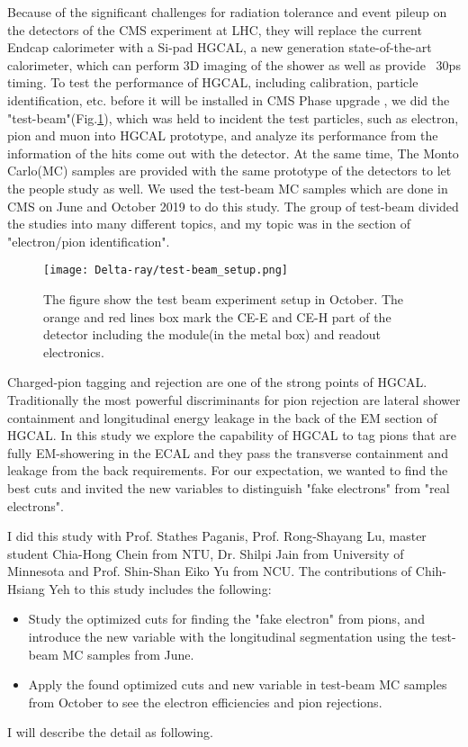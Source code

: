 \documentclass[12pt,twoside,a4paper,an,final]{cms-tdr}
\begin{document}
Because of the significant challenges for radiation tolerance and event pileup on the detectors of the CMS experiment at LHC, they will replace the current Endcap calorimeter with a Si-pad HGCAL, a new generation state-of-the-art calorimeter, which can perform 3D imaging of the shower as well as provide ~30ps timing. To test the performance of HGCAL, including calibration, particle identification, etc. before it will be installed in CMS Phase  upgrade , we did the "test-beam"(Fig.\ref{test_beam_setup_1}), which was held to incident the test particles, such as electron, pion and muon into HGCAL prototype, and analyze its performance from the information of the hits come out with the detector. At the same time,  The Monto Carlo(MC) samples are provided with the same prototype of the detectors to let the people study as well.  We used the test-beam MC samples which are done in CMS on June and October 2019 to do this study. The group of test-beam divided the studies into many different topics, and my topic was in the section of "electron/pion identification".
\begin{figure}[!htb]
\centering 
     \texttt{[image: Delta-ray/test-beam\_setup.png]}
\caption{The figure show the test beam experiment setup in October. The orange and red lines box mark the CE-E and CE-H part of the detector including the module(in the metal box) and readout electronics.}
\label{test_beam_setup_1}
\end{figure}

Charged-pion tagging and rejection are one of the strong points of HGCAL. Traditionally the most powerful discriminants for pion rejection are lateral shower containment and longitudinal energy leakage in the back of the EM section of HGCAL. In this study we explore the capability of HGCAL to tag pions that are fully EM-showering in the ECAL and they pass the transverse containment and leakage from the back requirements. For our expectation, we wanted to find the best cuts and invited the new variables to distinguish "fake electrons" from "real electrons".

I did this study with Prof. Stathes Paganis, Prof. Rong-Shayang Lu, master student Chia-Hong Chein from NTU, Dr. Shilpi Jain from University of Minnesota and Prof. Shin-Shan Eiko Yu from NCU.  The contributions of Chih-Hsiang Yeh to this study includes the following:
\begin{itemize}
\item Study the optimized cuts for finding the "fake electron" from pions, and introduce the new variable with the longitudinal segmentation using the test-beam MC samples from June.
\item Apply the found optimized cuts and new variable in test-beam MC samples from October to see the electron efficiencies and pion rejections.
\end{itemize}
I will describe the detail as following.
\end{document}
